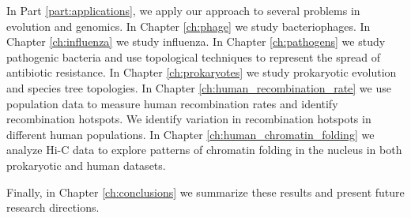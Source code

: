 In Part \ref{part:applications}, we apply our approach to several problems in evolution and genomics.
In Chapter \ref{ch:phage} we study bacteriophages.
In Chapter \ref{ch:influenza} we study influenza.
In Chapter \ref{ch:pathogens} we study pathogenic bacteria and use topological techniques to represent the spread of antibiotic resistance.
In Chapter \ref{ch:prokaryotes} we study prokaryotic evolution and species tree topologies.
In Chapter \ref{ch:human_recombination_rate} we use population data to measure human recombination rates and identify recombination hotspots.
We identify variation in recombination hotspots in different human populations.
In Chapter \ref{ch:human_chromatin_folding} we analyze Hi-C data to explore patterns of chromatin folding in the nucleus in both prokaryotic and human datasets.

Finally, in Chapter \ref{ch:conclusions} we summarize these results and present future research directions.